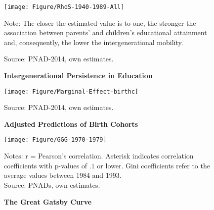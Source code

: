 \documentclass[a4paper, 12pt]{article}
\begin{document}
\newpage
\begin{figure}[htb]
\centering
\texttt{[image: Figure/RhoS-1940-1989-All]}
\begin{minipage}{0.87\textwidth} %
{\scriptsize
Note: The closer the estimated value is to one, the stronger the association between parents' and children's educational attainment and, consequently, the lower the intergenerational mobility.

Source: PNAD-2014, own estimates.\par}
\end{minipage}
\captionsetup{justification=centering,margin=2cm}
\caption{\textbf{Intergenerational Persistence in Education}}
\label{fig:RhoS-1940-1989}
\end{figure}



\begin{figure}[H]
\centering
\texttt{[image: Figure/Marginal-Effect-birthc]}
\begin{minipage}{0.88\textwidth} %
{\scriptsize
\vspace{-8.5pt}
Source: PNAD-2014, own estimates.\par}
\end{minipage}
\vspace{-5.0pt}
\captionsetup{justification=centering,margin=2cm}
\caption{\textbf{Adjusted Predictions of Birth Cohorts}}
\label{fig:Marginal-Effect}
\end{figure}


\newpage
\begin{figure}[htb]
\centering
\texttt{[image: Figure/GGG-1970-1979]}
\begin{minipage}{0.87\textwidth} %
{\scriptsize
Notes: r = Pearson's correlation. Asterisk indicates correlation coefficients with p-values of $.1$ or lower. Gini coefficients refer to the average values between 1984 and 1993. \\
Source: PNADs, own estimates.\par}
\end{minipage}
\captionsetup{justification=centering,margin=2cm}
\caption{\textbf{The Great Gatsby Curve}}
\label{fig:GGC}
\end{figure}
\end{document}
